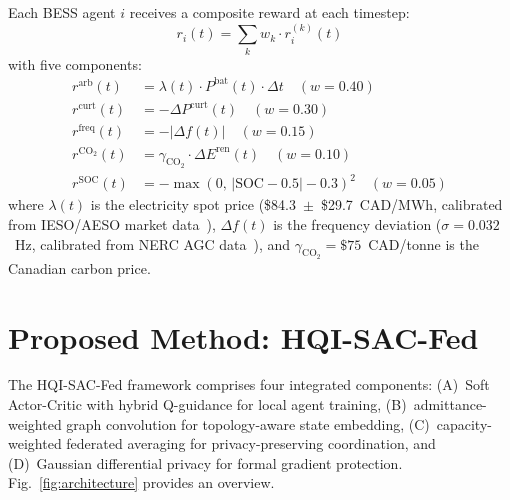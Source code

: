 \documentclass[journal]{IEEEtran}
\begin{document}
Each BESS agent $i$ receives a composite reward at each timestep:
\begin{equation}
  r_i(t) = \sum_k w_k \cdot r_i^{(k)}(t)
  \label{eq:reward}
\end{equation}
with five components:
\begin{align}
  r^{\mathrm{arb}}(t)  &= \lambda(t)\cdot P^{\mathrm{bat}}(t)\cdot\Delta t
    \quad (w = 0.40) \label{eq:r_arb}\\
  r^{\mathrm{curt}}(t) &= -\Delta P^{\mathrm{curt}}(t)
    \quad (w = 0.30) \label{eq:r_curt}\\
  r^{\mathrm{freq}}(t) &= -|\Delta f(t)|
    \quad (w = 0.15) \label{eq:r_freq}\\
  r^{\mathrm{CO_2}}(t) &= \gamma_{\mathrm{CO_2}}\cdot\Delta E^{\mathrm{ren}}(t)
    \quad (w = 0.10) \label{eq:r_co2}\\
  r^{\mathrm{SOC}}(t)  &= -\max(0,\,|{\mathrm{SOC}}-0.5|-0.3)^2
    \quad (w = 0.05) \label{eq:r_soc}
\end{align}
where $\lambda(t)$ is the electricity spot price
(\$84.3~$\pm$~\$29.7~CAD/MWh, calibrated from IESO/AESO market
data~\cite{ieso2024,aeso2024}), $\Delta f(t)$ is the frequency deviation
($\sigma = 0.032$~Hz, calibrated from NERC AGC data~\cite{nerc2024}),
and $\gamma_{\mathrm{CO_2}} = \$75$~CAD/tonne is the Canadian carbon price.

\section{Proposed Method: HQI-SAC-Fed}

The HQI-SAC-Fed framework comprises four integrated components:
(A)~Soft Actor-Critic with hybrid Q-guidance for local agent training,
(B)~admittance-weighted graph convolution for topology-aware state
embedding, (C)~capacity-weighted federated averaging for
privacy-preserving coordination, and (D)~Gaussian differential privacy
for formal gradient protection. Fig.~\ref{fig:architecture} provides
an overview.
\end{document}
